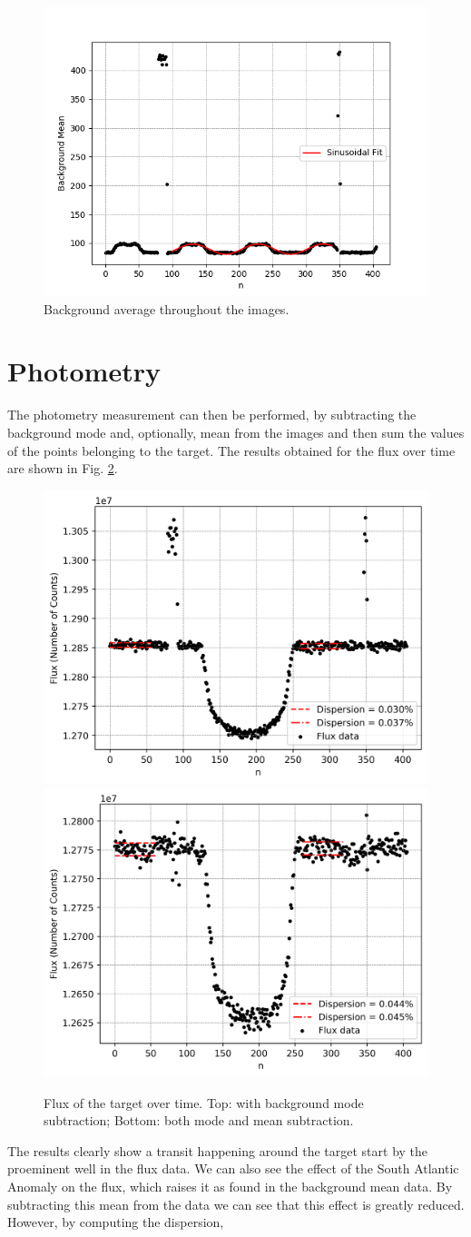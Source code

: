 \documentclass{aa}
\begin{document}
\begin{figure}
\centering

\includegraphics[width=.4\textwidth]{background_avg.png}

\caption{Background average throughout the images.}
\label{fig:mean}
\end{figure}

\section{Photometry}

The photometry measurement can then be performed, by subtracting the background mode and, optionally, mean from the images and then sum the values of the points belonging to the target. The results obtained for the flux over time are shown in Fig. \ref{fig:flux}.

\begin{figure}[H]
\centering
\includegraphics[width=.4\textwidth]{flux.png}
\includegraphics[width=.4\textwidth]{flux_no_avg.png}
\caption{Flux of the target over time. Top: with background mode subtraction; Bottom: both mode and mean subtraction.}
\label{fig:flux}
\end{figure}

The results clearly show a transit happening around the target start by the proeminent well in the flux data. We can also see the effect of the South Atlantic Anomaly on the flux, which raises it as found in the background mean data. By subtracting this mean from the data we can see that this effect is greatly reduced. However, by computing the dispersion,
\end{document}
